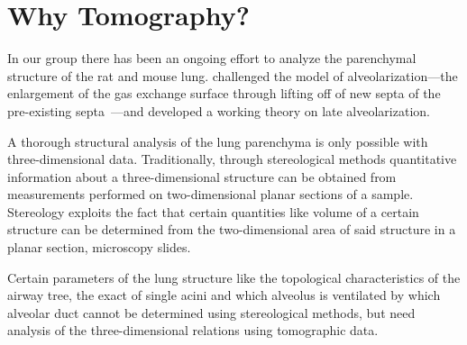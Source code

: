 \section{Why Tomography?}
In our group there has been an ongoing effort to analyze the parenchymal structure of the rat and mouse lung. \citet{Mund2008} challenged the model of alveolarization---the enlargement of the gas exchange surface through lifting off of new septa of the pre-existing septa~\cite{Burri1974}---and developed a working theory on late alveolarization. 

A thorough structural analysis of the lung parenchyma is only possible with three-dimensional data. Traditionally, through stereological methods quantitative information about a three-dimensional structure can be obtained from measurements performed on two-dimensional planar sections of a sample. Stereology exploits the fact that certain quantities like volume of a certain structure can be determined from the two-dimensional area of said structure in a planar section, \eg microscopy slides.

Certain parameters of the lung structure like the topological characteristics of the airway tree, the exact of single acini and which alveolus is ventilated by which alveolar duct cannot be determined using stereological methods, but need analysis of the three-dimensional relations using tomographic data.